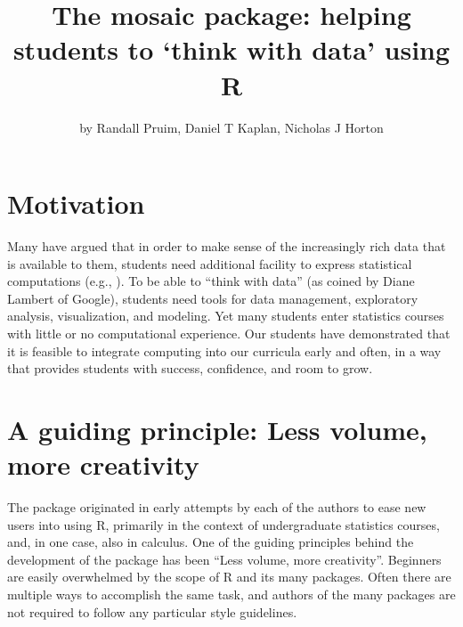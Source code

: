 \title{The mosaic package: helping students to `think with data' using R}
\author{by Randall Pruim, Daniel T Kaplan, Nicholas J Horton}

\maketitle


\section{Motivation}\label{motivation}

Many have argued that in order to make sense of the increasingly rich
data that is available to them, students need additional facility to
express statistical computations (e.g.,
\cite{NolanTempleLang:2010, HortonBaumerWickham:2015, HortonHardin:2015, Ridgway:2016}).
To be able to ``think with data'' (as coined by Diane Lambert of
Google), students need tools for data management, exploratory analysis,
visualization, and modeling. Yet many students enter statistics courses
with little or no computational experience. Our students have
demonstrated that it is feasible to integrate computing into our
curricula early and often, in a way that provides students with success,
confidence, and room to grow.

\section{A guiding principle: Less volume, more
creativity}\label{a-guiding-principle-less-volume-more-creativity}

The  \citep{mosaic} package originated in early attempts
by each of the authors to ease new users into using R, primarily in the
context of undergraduate statistics courses, and, in one case, also in
calculus. One of the guiding principles behind the development of the
 package has been ``Less volume, more creativity''.
Beginners are easily overwhelmed by the scope of R and its many
packages. Often there are multiple ways to accomplish the same task, and
authors of the many packages are not required to follow any particular
style guidelines.

